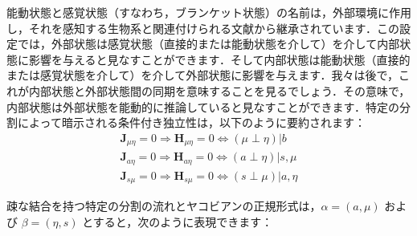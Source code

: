 \documentclass[a4paper, titlepage]{jsarticle}
\begin{document}
能動状態と感覚状態（すなわち，ブランケット状態）の名前は，外部環境に作用し，それを感知する生物系と関連付けられる文献から継承されています．この設定では，外部状態は感覚状態（直接的または能動状態を介して）を介して内部状態に影響を与えると見なすことができます．そして内部状態は能動状態（直接的または感覚状態を介して）を介して外部状態に影響を与えます．我々は後で，これが内部状態と外部状態間の同期を意味することを見るでしょう．その意味で，内部状態は外部状態を能動的に推論していると見なすことができます．特定の分割によって暗示される条件付き独立性は，以下のように要約されます：
\begin{equation}\label{Ensuing_conditional_independencies}
    \begin{aligned}
        \mathbf{J}_{\mu\eta} = 0 \Rightarrow \mathbf{H}_{\mu\eta} = 0 \Leftrightarrow (\mu \perp \eta) | b \\
        \mathbf{J}_{a\eta} = 0 \Rightarrow \mathbf{H}_{a\eta} = 0 \Leftrightarrow (a \perp \eta) | s, \mu \\
        \mathbf{J}_{s\mu} = 0 \Rightarrow \mathbf{H}_{s\mu} = 0 \Leftrightarrow (s \perp \mu) | a, \eta
    \end{aligned}
\end{equation}
\par
疎な結合を持つ特定の分割の流れとヤコビアンの正規形式は，$\alpha = (a, \mu)$ および $\beta = (\eta, s)$ とすると，次のように表現できます：
\end{document}
